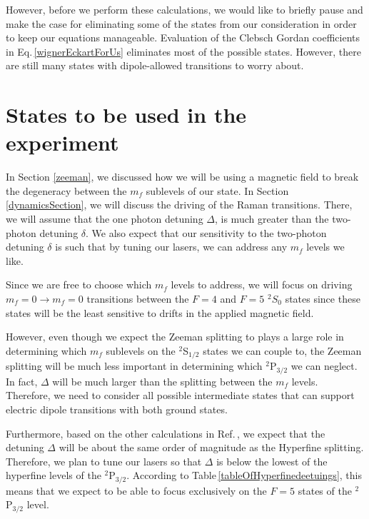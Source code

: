 However, before we perform these calculations, we would like to briefly pause and make the case for eliminating some of the states from our consideration in order to keep our equations manageable. 
Evaluation of the Clebsch Gordan coefficients in Eq.\,\ref{wignerEckartForUs} eliminates most of the possible states. However, there are still many states with dipole-allowed transitions to worry about. 

\section{States to be used in the experiment}
\label{figureOutStatesSection}

In Section \ref{zeeman}, we discussed how we will be using a magnetic field to break the degeneracy between the $m_f$ sublevels of our state.
In Section \ref{dynamicsSection}, we will discuss the driving of the Raman transitions. There, we will assume that the one photon detuning $\Delta$, is much greater than the two-photon detuning $\delta$. We also expect that our sensitivity to the two-photon detuning $\delta$ is such that by tuning our lasers, we can address any $m_f$ levels we like.

Since we are free to choose which $m_f$ levels to address, we will focus on driving $m_f=0\rightarrow m_f=0$ transitions between the $F=4$ and $F=5$ $^2 S_{0}$ states since these states will be the least sensitive to drifts in the applied magnetic field. 

However, even though we expect the Zeeman splitting to plays a large role in determining which $m_f$ sublevels on the $^2$S$_{1/2}$ states we can couple to, the Zeeman splitting will be much less important in determining which $^2$P$_{3/2}$ we can neglect. In fact, $\Delta$ will be much larger than the splitting between the $m_f$ levels. Therefore, we need to consider all possible intermediate states that can support electric dipole transitions with both ground states. %


Furthermore, based on the other calculations in Ref.\,\cite{cjeDiss}, we expect that the detuning $\Delta$ will be about the same order of magnitude as the Hyperfine splitting. Therefore, we plan to tune our lasers so that $\Delta$ is below the lowest of the hyperfine levels of the $^2$P$_{3/2}$. According to Table\,\ref{tableOfHyperfinedeetuings}, this means that we expect to be able to focus exclusively on the $F=5$ states of the $^2$P$_{3/2}$ level.

